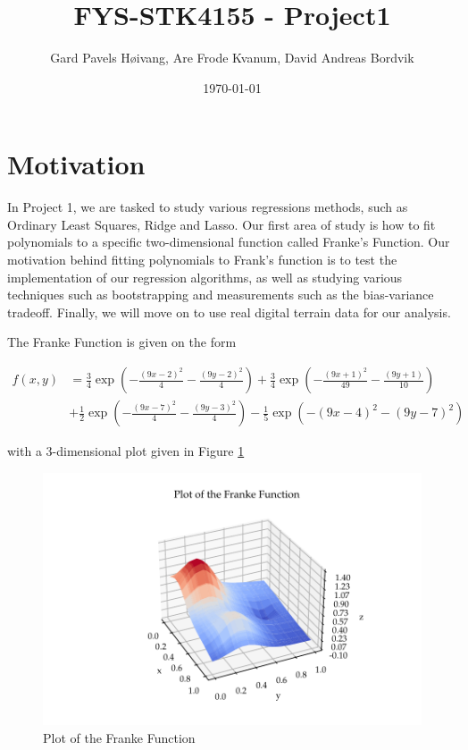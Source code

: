 \documentclass[11pt, a4paper]{article}
\title{FYS-STK4155 - Project1}
\author{Gard Pavels Høivang, Are Frode Kvanum, David Andreas Bordvik}
\date{\today}
\begin{document}
\maketitle

\section*{Motivation}
In Project 1, we are tasked to study various regressions methods, such as Ordinary Least Squares, Ridge and Lasso. Our first area of study is how to fit polynomials to a specific two-dimensional function called Franke's Function. Our motivation behind fitting polynomials to Frank's function is to test the implementation of our regression algorithms, as well as studying various techniques such as bootstrapping and measurements such as the bias-variance tradeoff. Finally, we will move on to use real digital terrain data for our analysis.

The Franke Function is given on the form

\begin{align*}
  f(x,y) & = \frac{3}{4}\exp{\left(-\frac{(9x-2)^2}{4} - \frac{(9y-2)^2}{4}\right)}+\frac{3}{4}\exp{\left(-\frac{(9x+1)^2}{49}- \frac{(9y+1)}{10}\right)} \\
         & +\frac{1}{2}\exp{\left(-\frac{(9x-7)^2}{4} - \frac{(9y-3)^2}{4}\right)} -\frac{1}{5}\exp{\left(-(9x-4)^2 - (9y-7)^2\right) }
\end{align*}

with a 3-dimensional plot given in Figure \ref{fig:1}

\begin{figure}[h]
  \centering
  \includegraphics[scale=0.75]{figures/EX1_franke_function_nonoise_preview.pdf}
  \caption{\label{fig:1}Plot of the Franke Function}
\end{figure}
\end{document}
